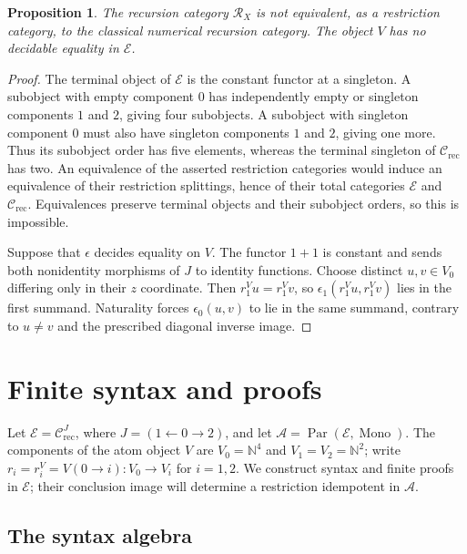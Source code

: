 \documentclass[11pt]{article}
\newtheorem{proposition}[theorem]{Proposition}
\newcommand{\N}{\mathbb N}
\begin{document}
\begin{proposition}\label{prop:fork-distinction}
The recursion category $\mathscr R_X$ is not equivalent, as a
restriction category, to the classical numerical recursion category.
The object $V$ has no decidable equality in $\mathcal E$.
\end{proposition}
\begin{proof}
The terminal object of $\mathcal E$ is the constant functor at a singleton.
A subobject with empty component $0$ has independently empty or
singleton components $1$ and $2$, giving four subobjects. A
subobject with singleton component $0$ must also have singleton
components $1$ and $2$, giving one more. Thus its subobject order has five elements, whereas
the terminal singleton of $\mathcal C_{\mathrm{rec}}$ has two.
An equivalence of the asserted restriction categories would induce
an equivalence of their restriction splittings, hence of their
total categories $\mathcal E$ and $\mathcal C_{\mathrm{rec}}$.
Equivalences preserve terminal objects and their subobject orders,
so this is impossible.

Suppose that $\epsilon$ decides equality on $V$. The functor $1+1$
is constant and sends both nonidentity morphisms of $J$ to
identity functions. Choose distinct $u,v\in V_0$ differing only
in their $z$ coordinate. Then $r_1^Vu=r_1^Vv$, so
$\epsilon_1(r_1^Vu,r_1^Vv)$ lies in the first summand.
Naturality forces $\epsilon_0(u,v)$ to lie in the same summand,
contrary to $u\ne v$ and the prescribed diagonal inverse image.
\end{proof}

\section{Finite syntax and proofs}
\label{app:fork-proofs}

Let $\mathcal E=\mathcal C_{\mathrm{rec}}^{J}$, where
$J=(1\leftarrow0\to2)$, and let
$\mathcal A=\operatorname{Par}(\mathcal E,\operatorname{Mono})$.
The components of the atom object $V$ are $V_0=\N^4$ and
$V_1=V_2=\N^2$; write $r_i=r_i^V=V(0\to i):V_0\to V_i$
for $i=1,2$.
We construct syntax and finite proofs in $\mathcal E$; their
conclusion image will determine a restriction idempotent in $\mathcal A$.

\subsection{The syntax algebra}
\end{document}
